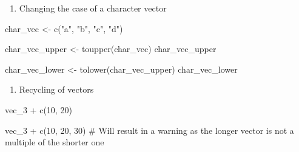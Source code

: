 \documentclass[
  letterpaper,
  DIV=11,
  numbers=noendperiod]{scrreprt}
\newenvironment{Shaded}{}{}
\newcommand{\CommentTok}[1]{\textcolor[rgb]{0.42,0.45,0.49}{#1}}
\newcommand{\DecValTok}[1]{\textcolor[rgb]{0.00,0.36,0.77}{#1}}
\newcommand{\FunctionTok}[1]{\textcolor[rgb]{0.44,0.26,0.76}{#1}}
\newcommand{\NormalTok}[1]{\textcolor[rgb]{0.14,0.16,0.18}{#1}}
\newcommand{\OtherTok}[1]{\textcolor[rgb]{0.44,0.26,0.76}{#1}}
\newcommand{\SpecialCharTok}[1]{\textcolor[rgb]{0.00,0.36,0.77}{#1}}
\newcommand{\StringTok}[1]{\textcolor[rgb]{0.01,0.18,0.38}{#1}}
\providecommand{\tightlist}{%
  \setlength{\itemsep}{0pt}\setlength{\parskip}{0pt}}\usepackage{longtable,booktabs,array}
\begin{document}
\begin{enumerate}
\def\labelenumi{\alph{enumi}.}
\tightlist
\item
  Changing the case of a character vector
\end{enumerate}

\begin{Shaded}
\begin{Highlighting}[]
\NormalTok{char\_vec }\OtherTok{\textless{}{-}} \FunctionTok{c}\NormalTok{(}\StringTok{"a"}\NormalTok{, }\StringTok{"b"}\NormalTok{, }\StringTok{"c"}\NormalTok{, }\StringTok{"d"}\NormalTok{)}
\end{Highlighting}
\end{Shaded}

\begin{Shaded}
\begin{Highlighting}[]
\NormalTok{char\_vec\_upper }\OtherTok{\textless{}{-}} \FunctionTok{toupper}\NormalTok{(char\_vec)}
\NormalTok{char\_vec\_upper}
\end{Highlighting}
\end{Shaded}

\begin{Shaded}
\begin{Highlighting}[]
\NormalTok{char\_vec\_lower }\OtherTok{\textless{}{-}} \FunctionTok{tolower}\NormalTok{(char\_vec\_upper)}
\NormalTok{char\_vec\_lower}
\end{Highlighting}
\end{Shaded}

\begin{enumerate}
\def\labelenumi{\arabic{enumi}.}
\setcounter{enumi}{3}
\tightlist
\item
  Recycling of vectors
\end{enumerate}

\begin{Shaded}
\begin{Highlighting}[]
\NormalTok{vec\_3 }\SpecialCharTok{+} \FunctionTok{c}\NormalTok{(}\DecValTok{10}\NormalTok{, }\DecValTok{20}\NormalTok{)}
\end{Highlighting}
\end{Shaded}

\begin{Shaded}
\begin{Highlighting}[]
\NormalTok{vec\_3 }\SpecialCharTok{+} \FunctionTok{c}\NormalTok{(}\DecValTok{10}\NormalTok{, }\DecValTok{20}\NormalTok{, }\DecValTok{30}\NormalTok{) }
\CommentTok{\# Will result in a warning as the longer vector is not a multiple of the shorter one}
\end{Highlighting}
\end{Shaded}
\end{document}
